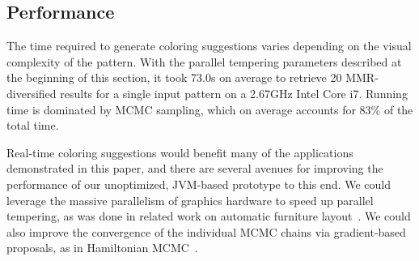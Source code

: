 \subsection{Performance}

The time required to generate coloring suggestions varies depending on the visual complexity of the pattern. With the parallel tempering parameters described at the beginning of this section, it took 73.0s on average to retrieve 20 MMR-diversified results for a single input pattern on a 2.67GHz Intel Core i7. Running time is dominated by MCMC sampling, which on average accounts for 83\% of the total time.

Real-time coloring suggestions would benefit many of the applications demonstrated in this paper, and there are several avenues for improving the performance of our unoptimized, JVM-based prototype to this end. We could leverage the massive parallelism of graphics hardware to speed up parallel tempering, as was done in related work on automatic furniture layout~\cite{MerrellFurnitureLayout}. We could also improve the convergence of the individual MCMC chains via gradient-based proposals, as in Hamiltonian MCMC~\cite{HamiltonianMCMC}.



